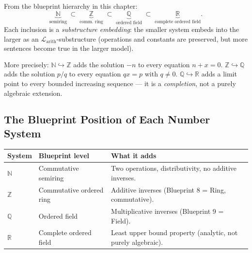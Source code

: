 \begin{remark}
From the blueprint hierarchy in this chapter:
\[
\underbrace{\mathbb{N}}_{\text{semiring}}
\;\subset\;
\underbrace{\mathbb{Z}}_{\text{comm.\ ring}}
\;\subset\;
\underbrace{\mathbb{Q}}_{\text{ordered field}}
\;\subset\;
\underbrace{\mathbb{R}}_{\text{complete ordered field}}.
\]
Each inclusion is a \emph{substructure embedding}: the smaller system
embeds into the larger as an $\mathcal{L}_{\mathrm{arith}}$-substructure
(operations and constants are preserved, but more sentences become true
in the larger model).

More precisely:
$\mathbb{N} \hookrightarrow \mathbb{Z}$ adds the solution $-n$ to every
equation $n + x = 0$.
$\mathbb{Z} \hookrightarrow \mathbb{Q}$ adds the solution $p/q$ to every
equation $qx = p$ with $q \neq 0$.
$\mathbb{Q} \hookrightarrow \mathbb{R}$ adds a limit point to every
bounded increasing sequence --- it is a \emph{completion}, not a purely
algebraic extension.
\end{remark}

\subsection*{The Blueprint Position of Each Number System}

\begin{tcolorbox}[colback=gray!6, colframe=gray!40, arc=2pt,
  left=6pt, right=6pt, top=4pt, bottom=4pt,
  title={\small\textbf{Number Systems in the Blueprint Hierarchy}},
  fonttitle=\small\bfseries]
\small
\renewcommand{\arraystretch}{1.3}
\begin{tabular}{@{} l l l @{}}
\toprule
\textbf{System} & \textbf{Blueprint level} & \textbf{What it adds} \\
\midrule
$\mathbb{N}$
  & Commutative semiring
  & Two operations, distributivity, no additive inverses. \\
$\mathbb{Z}$
  & Commutative ordered ring
  & Additive inverses (Blueprint 8 = Ring, commutative). \\
$\mathbb{Q}$
  & Ordered field
  & Multiplicative inverses (Blueprint 9 = Field). \\
$\mathbb{R}$
  & Complete ordered field
  & Least upper bound property (analytic, not purely algebraic). \\
\bottomrule
\end{tabular}
\end{tcolorbox}

